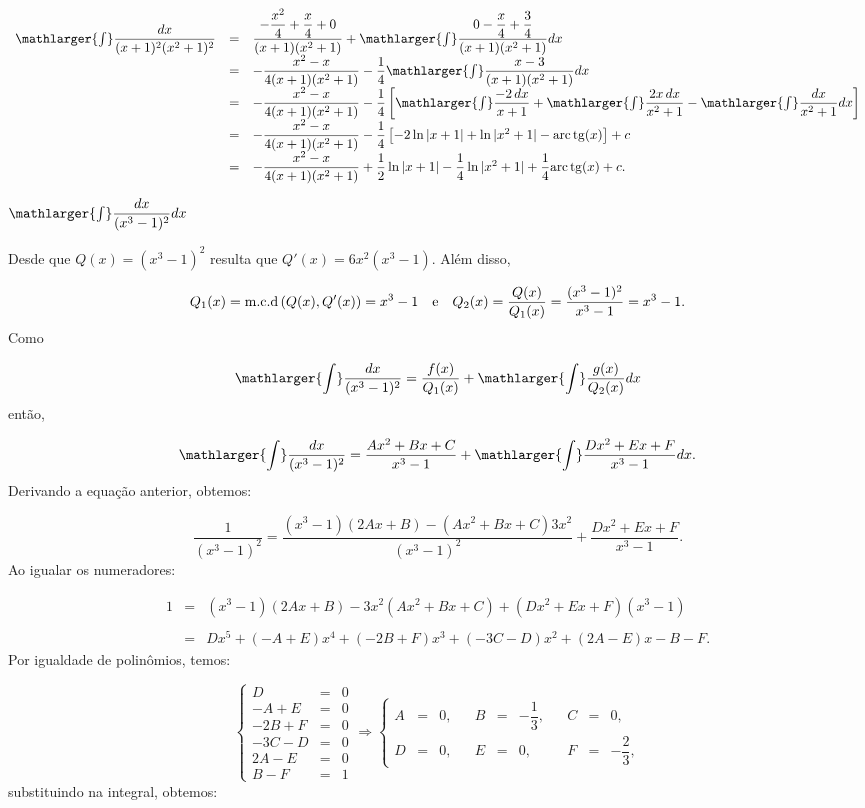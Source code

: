 \cleardoublepage\documentclass[../main.tex]{subfiles}
\begin{document}
\begin{ex}
\begin{compactenum}[a)]
\begin{solution}
\[ \begin{array}{rcl} \mathlarger{\int}\dfrac{dx}{(x+1)^2(x^2+1)^2} &=& \dfrac{-\dfrac{x^2}{4}+\dfrac{x}{4}+0}{(x+1)(x^2+1)} + \mathlarger{\int}\dfrac{0-\dfrac{x}{4}+\dfrac{3}{4}}{(x+1)(x^2+1)}dx\\ &=&-\dfrac{x^2-x}{4(x+1)(x^2+1)} - \dfrac{1}{4} \mathlarger{\int}\dfrac{x-3}{(x+1)(x^2+1)}dx\\ &=&-\dfrac{x^2-x}{4(x+1)(x^2+1)} - \dfrac{1}{4} \left[\mathlarger{\int}\dfrac{-2\,dx}{x+1} + \mathlarger{\int}\dfrac{2x\,dx}{x^2+1} - \mathlarger{\int}\dfrac{dx}{x^2+1}dx\right]\\ &=&-\dfrac{x^2-x}{4(x+1)(x^2+1)} - \dfrac{1}{4} \left[ -2\ln|x+1| + \ln|x^2+1| - {\rm arc\,tg} (x)\right]+c\\ &=&-\dfrac{x^2-x}{4(x+1)(x^2+1)} + \dfrac{1}{2} \ln|x+1| -\dfrac{1}{4} \ln|x^2+1| + \dfrac{1}{4}{\rm arc\,tg} (x)+c. \end{array} \]
\end{solution}
\item \(\mathlarger{\int}\dfrac{dx}{(x^3-1)^2} dx\)\\

\begin{solution}
Desde que \(Q(x)=(x^3-1)^2\) resulta que \(Q'(x)=6x^2(x^3-1)\). Além disso,

\[ Q_1(x) = {\rm m.c.d}\left(Q(x), Q'(x)\right) = x^3-1\quad \mbox{e}\quad Q_2(x) = \dfrac{Q(x)}{Q_1(x)}= \dfrac{(x^3-1)^2}{x^3-1}=x^3-1. \]
Como

\[ \mathlarger{\int}\dfrac{dx}{(x^3-1)^2}= \dfrac{f(x)}{Q_1(x)} + \mathlarger{\int}\dfrac{g(x)}{Q_2(x)}dx \]
então,

\[ \mathlarger{\int}\dfrac{dx}{(x^3-1)^2}= \dfrac{Ax^2+Bx+C}{x^3-1} + \mathlarger{\int}\dfrac{Dx^2+Ex+F}{x^3-1}dx. \]
Derivando a equação anterior, obtemos:

\[ \dfrac{1}{(x^3-1)^2} = \dfrac{(x^3-1)(2Ax+B)-(Ax^2+Bx+C)3x^2}{(x^3-1)^2} +\dfrac{Dx^2+Ex+F}{x^3-1}. \]
Ao igualar os numeradores:

\[ \begin{array}{rcl} 1&=& (x^3-1)(2Ax+B) -3x^2(Ax^2+Bx+C)+(Dx^2+Ex+F)(x^3-1)\\ \\ &=&Dx^5+(-A+E)x^4 +(-2B+F)x^3+(-3C-D)x^2 + (2A-E)x -B-F . \end{array} \]
Por igualdade de polinômios, temos:

\[ \left\{ \begin{array}{rcr} D &=&0\\ -A+E &=&0\\ -2B+F&=&0\\ -3C- D&=&0\\ 2A-E&=&0\\ B-F&=&1 \end{array} \right. \Rightarrow \left\{ \begin{array}{ccrcccrcccc} A&=&0,& & B&=&-\dfrac{1}{3},& & C&=&0,\\ D&=&0,& & E&=&0,& & F&=&-\dfrac{2}{3}, \end{array} \right. \]
substituindo na integral, obtemos:


\end{solution}
\end{compactenum}
\end{ex}
\end{document}
